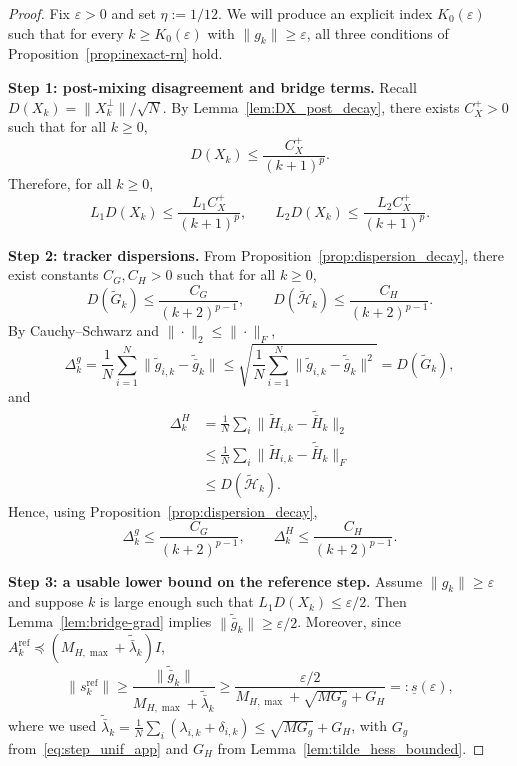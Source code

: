 \documentclass[review,onefignum,onetabnum]{siamart171218}
\begin{document}
	\begin{proof}
		Fix $\varepsilon>0$ and set $\eta:=1/12$.
		We will produce an explicit index $K_0(\varepsilon)$ such that for every $k\ge K_0(\varepsilon)$ with $\|g_k\|\ge \varepsilon$,
		all three conditions of Proposition~\ref{prop:inexact-rn} hold.
		
		\smallskip
		\noindent\textbf{Step 1: post-mixing disagreement and bridge terms.}
		Recall $D(X_k)=\|X_k^\perp\|/\sqrt N$.
		By Lemma~\ref{lem:DX_post_decay}, there exists $C_X^{+}>0$ such that for all $k\ge 0$,
		\begin{equation}\label{eq:DX_post_decay_app}
			D(X_k)\le \frac{C_X^{+}}{(k+1)^p}.
		\end{equation}
		Therefore, for all $k\ge 0$,
		\begin{equation}\label{eq:bridge_targets_app}
			L_1D(X_k)\le \frac{L_1C_X^{+}}{(k+1)^p},
			\qquad
			L_2D(X_k)\le \frac{L_2C_X^{+}}{(k+1)^p}.
		\end{equation}
		
		\smallskip
		\noindent\textbf{Step 2: tracker dispersions.}
		From Proposition~\ref{prop:dispersion_decay}, there exist constants $C_G,C_H>0$ such that for all $k\ge 0$,
		\begin{equation}\label{eq:GH_decay_app}
			D(\tilde G_k)\le \frac{C_G}{(k+2)^{p-1}},
			\qquad
			D(\tilde{\mathcal H}_k)\le \frac{C_H}{(k+2)^{p-1}}.
		\end{equation}
		By Cauchy--Schwarz and $\|\cdot\|_2\le \|\cdot\|_F$,
		\[
		\Delta_k^g
		=\frac1N\sum_{i=1}^N\|\tilde g_{i,k}-\tilde{\bar g}_k\|
		\le \sqrt{\frac1N\sum_{i=1}^N\|\tilde g_{i,k}-\tilde{\bar g}_k\|^2}
		= D(\tilde G_k),
		\]
		and
		\begin{align*}
			\Delta_k^H
			&=\tfrac1N\textstyle\sum_{i}\big\|\tilde H_{i,k}\!-\!\tilde{\bar H}_k\big\|_2\\
			&\le \tfrac1N\textstyle\sum_{i}\big\|\tilde H_{i,k}\!-\!\tilde{\bar H}_k\big\|_F\\
			&\le D(\tilde{\mathcal H}_k).
		\end{align*}
		Hence, using Proposition~\ref{prop:dispersion_decay},
		\begin{equation}\label{eq:Delta_decay_app}
			\Delta_k^g\le \frac{C_G}{(k+2)^{p-1}},
			\qquad
			\Delta_k^H\le \frac{C_H}{(k+2)^{p-1}}.
		\end{equation}
		
		\smallskip
		\noindent\textbf{Step 3: a usable lower bound on the reference step.}
		Assume $\|g_k\|\ge \varepsilon$ and suppose $k$ is large enough such that $L_1D(X_k)\le \varepsilon/2$.
		Then Lemma~\ref{lem:bridge-grad} implies
		$\|\tilde{\bar g}_k\|\ge \varepsilon/2$.
		Moreover, since $A_k^{\mathrm{ref}}\preceq (M_{H,\max}+\tilde{\bar\lambda}_k)I$,
		\[
		\|s_k^{\mathrm{ref}}\|
		\ge \frac{\|\tilde{\bar g}_k\|}{M_{H,\max}+\tilde{\bar\lambda}_k}
		\ge \frac{\varepsilon/2}{M_{H,\max}+\sqrt{MG_g}+G_H}
		=:\underline s(\varepsilon),
		\]
		where we used $\tilde{\bar\lambda}_k=\frac{1}{N}\sum_i(\lambda_{i,k}+\delta_{i,k})\le \sqrt{MG_g}+G_H$, with $G_g$ from~\eqref{eq:step_unif_app} and $G_H$ from Lemma~\ref{lem:tilde_hess_bounded}.
		

\end{proof}
\end{document}
